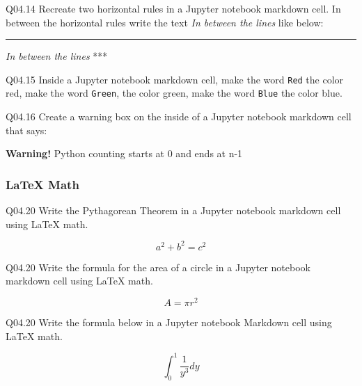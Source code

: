 \documentclass{book}
\newenvironment{problems}{}{}  %
\newcommand{\passthrough}[1]{#1}
\begin{document}
\begin{problems}
Q04.14 Recreate two horizontal rules in a Jupyter notebook markdown
cell. In between the horizontal rules write the text \emph{In between
the lines} like below:

\begin{center}\rule{0.5\linewidth}{\linethickness}\end{center}

\emph{In between the lines} ***

Q04.15 Inside a Jupyter notebook markdown cell, make the word
\passthrough{\lstinline!Red!} the color red, make the word
\passthrough{\lstinline!Green!}, the color green, make the word
\passthrough{\lstinline!Blue!} the color blue.

Q04.16 Create a warning box on the inside of a Jupyter notebook markdown
cell that says:

\textbf{Warning!} Python counting starts at 0 and ends at n-1
        \end{problems}

    




    
        \hypertarget{latex-math}{%
\subsubsection{LaTeX Math}\label{latex-math}}

Q04.20 Write the Pythagorean Theorem in a Jupyter notebook markdown cell
using LaTeX math.

\[ a^2 + b^2 = c^2 \]

Q04.20 Write the formula for the area of a circle in a Jupyter notebook
markdown cell using LaTeX math.

\[ A = \pi r^2 \]

Q04.20 Write the formula below in a Jupyter notebook Markdown cell using
LaTeX math.

\[ \int_{0}^{1} \frac{1}{y^3} dy \]
    
\end{document}
